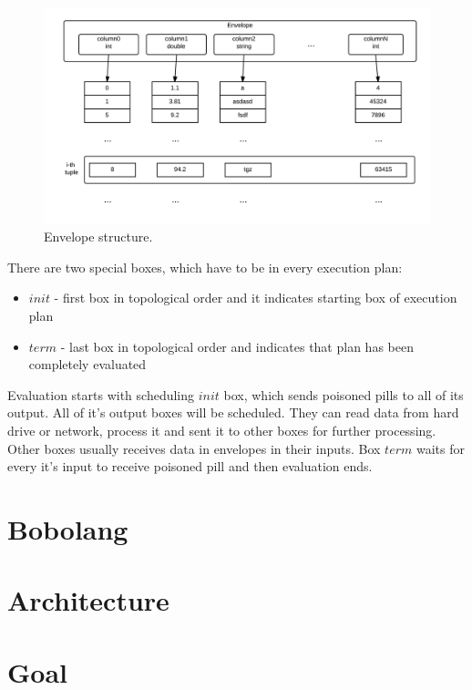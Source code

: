 \begin{figure}[h!]
  \centering
    \includegraphics[width=1\textwidth]{envelope}

      \caption{Envelope structure.}
          \label{fig:envelope}
\end{figure}
There are two special boxes, which have to be in every execution plan:
\begin{itemize}


\item $init$ - first box in topological order and it indicates starting box of execution plan

\item $term$ - last box in topological order and indicates that plan has been completely evaluated

\end{itemize}

Evaluation starts with scheduling $init$ box, which sends poisoned pills to all of its output. All of it's output boxes will be scheduled. They can read data from hard drive or network, process it and sent it to other boxes for further processing. Other boxes usually receives data in envelopes in their inputs. Box $term$ waits for every it's input to receive poisoned pill and then evaluation ends.

\section{Bobolang}

\section{Architecture}

\section{Goal}